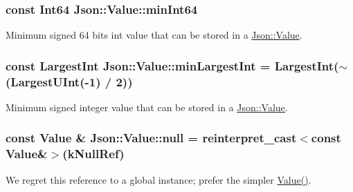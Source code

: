 \subsubsection[{\texorpdfstring{min\+Int64}{minInt64}}]{\setlength{\rightskip}{0pt plus 5cm}const {\bf Int64} Json\+::\+Value\+::min\+Int64\hspace{0.3cm}{\ttfamily [static]}}\hypertarget{classJson_1_1Value_a815ef899bc312c93bc426511acfe31a7}{}\label{classJson_1_1Value_a815ef899bc312c93bc426511acfe31a7}


Minimum signed 64 bits int value that can be stored in a \hyperlink{classJson_1_1Value}{Json\+::\+Value}. 

\subsubsection[{\texorpdfstring{min\+Largest\+Int}{minLargestInt}}]{\setlength{\rightskip}{0pt plus 5cm}const {\bf Largest\+Int} Json\+::\+Value\+::min\+Largest\+Int = {\bf Largest\+Int}($\sim$({\bf Largest\+U\+Int}(-\/1) / 2))\hspace{0.3cm}{\ttfamily [static]}}\hypertarget{classJson_1_1Value_af91df130daa50dd43d2cd89e6ee67706}{}\label{classJson_1_1Value_af91df130daa50dd43d2cd89e6ee67706}


Minimum signed integer value that can be stored in a \hyperlink{classJson_1_1Value}{Json\+::\+Value}. 

\subsubsection[{\texorpdfstring{null}{null}}]{\setlength{\rightskip}{0pt plus 5cm}const {\bf Value} \& Json\+::\+Value\+::null = reinterpret\+\_\+cast$<$const {\bf Value}\&$>$({\bf k\+Null\+Ref})\hspace{0.3cm}{\ttfamily [static]}}\hypertarget{classJson_1_1Value_a6d6e9ea6807e46d5b7ded66d3032f607}{}\label{classJson_1_1Value_a6d6e9ea6807e46d5b7ded66d3032f607}


We regret this reference to a global instance; prefer the simpler \hyperlink{classJson_1_1Value_ada6ba1369448fb0240bccc36efaa46f7}{Value()}. 

